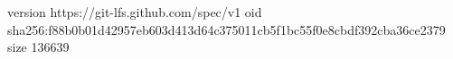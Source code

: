 version https://git-lfs.github.com/spec/v1
oid sha256:f88b0b01d42957eb603d413d64c375011cb5f1bc55f0e8cbdf392cba36ce2379
size 136639
